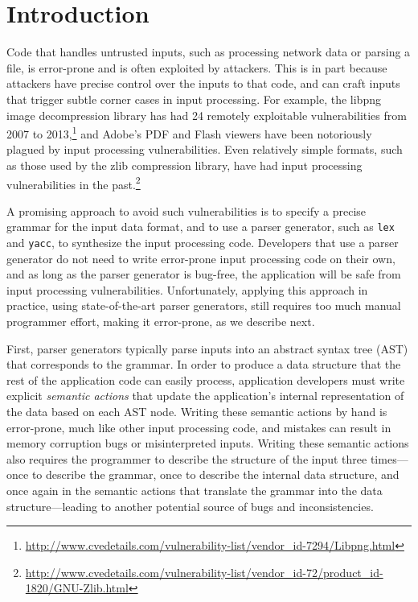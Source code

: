 \section{Introduction}

Code that handles untrusted inputs, such as processing network
data or parsing a file, is error-prone and is often exploited by
attackers.  This is in part because attackers have precise control
over the inputs to that code, and can craft inputs that trigger
subtle corner cases in input processing.  For example, the libpng image decompression
library has had 24 remotely exploitable vulnerabilities from 2007 to
2013,\footnote{\url{http://www.cvedetails.com/vulnerability-list/vendor_id-7294/Libpng.html}}
and Adobe's PDF and Flash viewers have been notoriously
plagued by input processing vulnerabilities.  Even relatively
simple formats, such as those used by the zlib compression
library, have had input processing vulnerabilities in the
past.\footnote{\url{http://www.cvedetails.com/vulnerability-list/vendor_id-72/product_id-1820/GNU-Zlib.html}}

A promising approach to avoid such vulnerabilities is to specify
a precise grammar for the input data format, and to use a parser
generator, such as {\tt lex} and {\tt yacc}, to synthesize the input
processing code.  Developers that use a parser generator do not need
to write error-prone input processing code on their own, and as long
as the parser generator is bug-free, the application will be safe from
input processing vulnerabilities.  Unfortunately, applying this approach
in practice, using state-of-the-art parser generators, still requires
too much manual programmer effort, making it error-prone, as we describe
next.

First, parser generators typically parse inputs into an abstract syntax
tree (AST) that corresponds to the grammar.  In order to produce a data
structure that the rest of the application code can easily process,
application developers must write explicit {\em semantic actions} that
update the application's internal representation of the data based on
each AST node.  Writing these semantic actions by hand is error-prone,
much like other input processing code, and mistakes can result in memory
corruption bugs or misinterpreted inputs.  Writing these semantic actions
also requires the programmer to describe the structure of the input three
times---once to describe the grammar, once to describe the internal data
structure, and once again in the semantic actions that translate the
grammar into the data structure---leading to another potential source
of bugs and inconsistencies.

